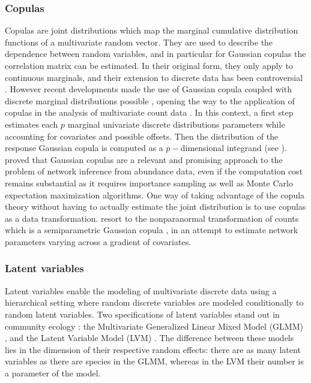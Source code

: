 \subsubsection{Copulas}
Copulas are  joint  distributions which map the marginal  cumulative distribution functions of a multivariate random vector.  They are used to describe the dependence between random variables, and in particular for Gaussian copulas the correlation matrix can be estimated. In their original form, they only apply to continuous marginals, and their extension to discrete data has been controversial \citep{F17}. However recent developments made the use of  Gaussian copula coupled with discrete marginal distributions possible \citep{PCJ12,PHW18}, opening the way to the application of copulas in the analysis of multivariate count data \citep{AVP19}. In this context, a first step estimates each $p$ marginal univariate discrete distributions parameters while accounting for covariates and possible offsets. Then the distribution of the response Gaussian copula is computed as a $p-$dimensional integrand (see \citet{PHW18}). \citet{PWT19} proved that  Gaussian copulas are a relevant and promising approach to the problem of network inference from abundance data, even if the computation cost remains substantial as it requires importance sampling as well as Monte Carlo expectation maximization algorithms. One way of taking advantage of the copula theory without having to actually estimate the joint distribution is to use copulas as a data transformation. \cite{CWL18} resort to the nonparanormal transformation of counts which is a semiparametric Gaussian copula \citep{LLW09}, in an attempt to estimate network parameters varying across a gradient of covariates. 

\subsubsection{Latent variables}

Latent variables enable the modeling of multivariate discrete data using a hierarchical setting where random discrete variables are modeled conditionally to random latent variables.  Two specifications of  latent variables stand out in community ecology \citep{WBO15}:  the Multivariate Generalized Linear Mixed Model (GLMM) \citep{OHS10, PTM14}, and the Latent Variable Model (LVM)  \citep{OAP16, OTN17}. The difference between these models lies in the dimension of their respective random effects: there are as many latent variables as there are species in the GLMM, whereas in the LVM their number is a parameter of the model. 

